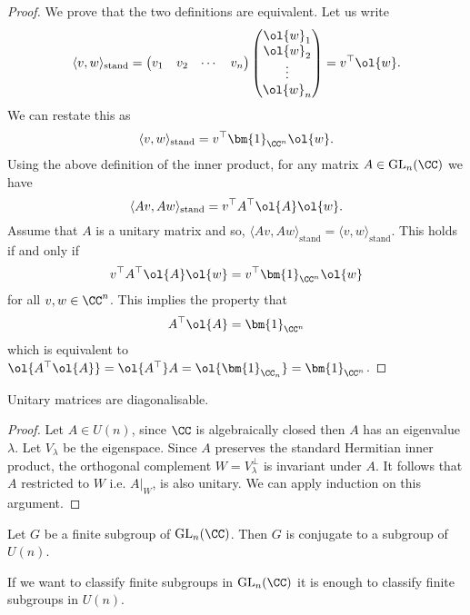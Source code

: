 \documentclass[12pt, a4paper]{article}
\newcommand{\gl}{\text{GL}}
\begin{document}
\begin{proof}
    We prove that the two definitions are equivalent. Let us write 
    \[\langle v,w\rangle_\text{stand} = \begin{pmatrix}
        v_1 & v_2 & \cdots & v_n \end{pmatrix} \begin{pmatrix}
        \ol{w}_1 \\\ol{w}_2 \\ \vdots \\ \ol{w}_n \end{pmatrix}= v^{\top} \ol{w}.\] 
    We can restate this as 
    \[\langle v,w \rangle_{\text{stand}} = v^{\top}\bm{1}_{\CC^n}\ol{w}.\]
    Using the above definition of the inner product, for any matrix \(A \in \gl_n(\CC)\) we have 
    \[\langle Av,Aw \rangle_{\text{stand}}=v^{\top}A^{\top}\ol{A}\ol{w}.\]
    Assume that \(A\) is a unitary matrix and so, \(\langle Av,Aw\rangle_{\text{stand}} = \langle v,w\rangle_{\text{stand}}\). This holds if and only if 
    \[v^{\top}A^{\top}\ol{A}\ol{w}=v^{\top}\bm{1}_{\CC^n}\ol{w}\]
    for all \(v,w \in \CC^n\). This implies the property that 
    \[A^{\top}\ol{A}=\bm{1}_{\CC^n}\]
    which is equivalent to \(\ol{A^{\top}\ol{A}}= \ol{A^{\top}}A=\ol{\bm{1}_{\CC_n}}=\bm{1}_{\CC^n}\).
\end{proof}

\begin{theorem}
    Unitary matrices are diagonalisable.
\end{theorem}

\begin{proof}
    Let \(A \in U(n)\), since \(\CC\) is algebraically closed then \(A\) has an eigenvalue \(\lambda\). Let \(V_{\lambda}\) be the eigenspace. Since \(A\) preserves the standard Hermitian inner product, the orthogonal complement \(W = V_{\lambda}^{\perp}\) is invariant under \(A\). It follows that \(A\) restricted to \(W\) i.e. \(A\vert_W\), is also unitary. We can apply induction on this argument. 
\end{proof}

\begin{mdprop}
    Let \(G\) be a finite subgroup of \(\gl_n(\CC)\). Then \(G\) is conjugate to a subgroup of \(U(n)\).
\end{mdprop}

\begin{mdnote}
    If we want to classify finite subgroups in \(\gl_n(\CC)\) it is enough to classify finite subgroups in \(U(n)\).
\end{mdnote}
\end{document}
